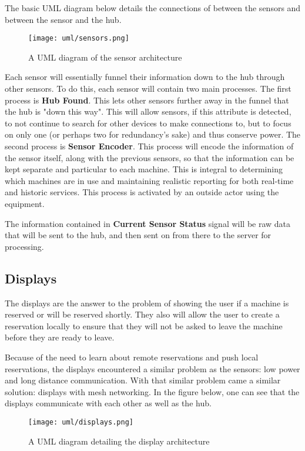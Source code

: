 \documentclass[PPFS.tex]{template/subfiles}
\begin{document}
The basic UML diagram below details the connections of between the sensors and between the sensor and the hub.

\begin{figure}[h]
    \centering
    \texttt{[image: uml/sensors.png]}
    \caption{A UML diagram of the sensor architecture}
\end{figure}

Each sensor will essentially funnel their information down to the hub through other sensors. To do this, each sensor will contain two main processes. The first process is \textbf{Hub Found}. This lets other sensors further away in the funnel that the hub is "down this way". This will allow sensors, if this attribute is detected, to not continue to search for other devices to make connections to, but to focus on only one (or perhaps two for redundancy's sake) and thus conserve power. The second process is \textbf{Sensor Encoder}. This process will encode the information of the sensor itself, along with the previous sensors, so that the information can be kept separate and particular to each machine. This is integral to determining which machines are in use and maintaining realistic reporting for both real-time and historic services. This process is activated by an outside actor using the equipment.

The information contained in \textbf{Current Sensor Status} signal will be raw data that will be sent to the hub, and then sent on from there to the server for processing.

\subsection{Displays}

The displays are the answer to the problem of showing the user if a machine is reserved or will be reserved shortly. They also will allow the user to create a reservation locally to ensure that they will not be asked to leave the machine before they are ready to leave.


Because of the need to learn about remote reservations and push local reservations, the displays encountered a similar problem as the sensors: low power and long distance communication. With that similar problem came a similar solution: displays with mesh networking. In the figure below, one can see that the displays communicate with each other as well as the hub.

\begin{figure}[h]
    \centering
    \texttt{[image: uml/displays.png]}
    \caption{A UML diagram detailing the display architecture}
\end{figure}
\end{document}
